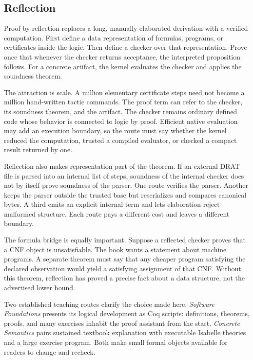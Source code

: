 \subsection{Reflection}

Proof by reflection replaces a long, manually elaborated derivation with a
verified computation. First define a data representation of formulas,
programs, or certificates inside the logic. Then define a checker over that
representation. Prove once that whenever the checker returns acceptance, the
interpreted proposition follows. For a concrete artifact, the kernel evaluates
the checker and applies the soundness theorem.

The attraction is scale. A million elementary certificate steps need not
become a million hand-written tactic commands. The proof term can refer to the
checker, its soundness theorem, and the artifact. The checker remains ordinary
defined code whose behavior is connected to logic by proof. Efficient native
evaluation may add an execution boundary, so the route must say whether the
kernel reduced the computation, trusted a compiled evaluator, or checked a
compact result returned by one.

Reflection also makes representation part of the theorem. If an external DRAT
file is parsed into an internal list of steps, soundness of the internal
checker does not by itself prove soundness of the parser. One route verifies
the parser. Another keeps the parser outside the trusted base but reserializes
and compares canonical bytes. A third emits an explicit internal term and
lets elaboration reject malformed structure. Each route pays a different cost
and leaves a different boundary.

The formula bridge is equally important. Suppose a reflected checker proves
that a CNF object is unsatisfiable. The book wants a statement about machine
programs. A separate theorem must say that any cheaper program satisfying the
declared observation would yield a satisfying assignment of that CNF. Without
this theorem, reflection has proved a precise fact about a data structure, not
the advertised lower bound.

Two established teaching routes clarify the choice made here. \emph{Software
Foundations} presents its logical development as Coq scripts: definitions,
theorems, proofs, and many exercises inhabit the proof assistant from the
start. \emph{Concrete Semantics} pairs sustained textbook explanation with
executable Isabelle theories and a large exercise program.
\autocite{pierce2026softwarefoundations,nipkow2014concretesemantics} Both make
small formal objects available for readers to change and recheck.


